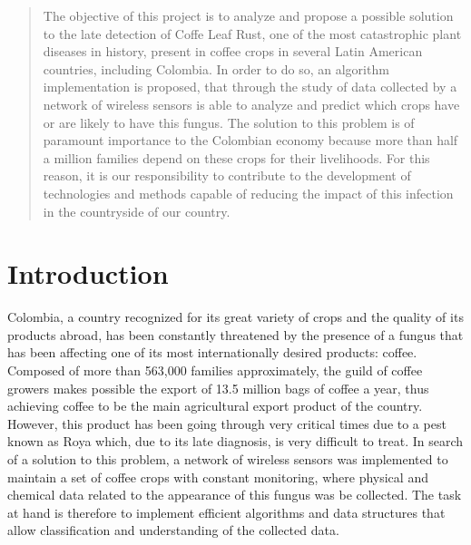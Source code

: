 \documentclass{acm_proc_article-sp}
\begin{document}
\maketitle
\begin{abstract}
The objective of this project is to analyze and propose a possible solution to the late detection of Coffe Leaf Rust, one of the most catastrophic plant diseases in history, present in coffee crops in several Latin American countries, including Colombia.  In order to do so, an algorithm implementation is proposed, that through the study of data collected by a network of wireless sensors is able to analyze and predict which crops have or are likely to have this fungus.
The solution to this problem is of paramount importance to the Colombian economy because more than half a million families depend on these crops for their livelihoods.  For this reason, it is our responsibility to contribute to the development of technologies and methods capable of reducing the impact of this infection in the countryside of our country.
\end{abstract}




\section{Introduction}
Colombia, a country recognized for its great variety of crops and the quality of its products abroad, has been constantly threatened by the presence of a fungus that has been affecting one of its most internationally desired products: coffee. Composed of more than 563,000 families approximately, the guild of coffee growers makes possible the export of 13.5 million bags of coffee a year, thus achieving coffee to be the main agricultural export product of the country. However, this product has been going through very critical times due to a pest known as Roya which, due to its late diagnosis, is very difficult to treat.
In search of a solution to this problem, a network of wireless sensors was implemented to maintain a set of coffee crops with constant monitoring, where physical and chemical data related to the appearance of this fungus was be collected. The task at hand is therefore to implement efficient algorithms and data structures that allow classification and understanding of the collected data.
\end{document}
